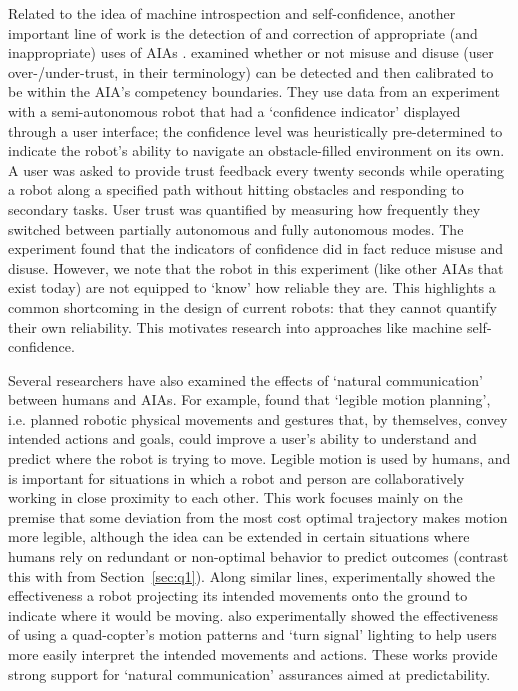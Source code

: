 Related to the idea of machine introspection and self-confidence, another important line of work is the detection of and correction of appropriate (and inappropriate) uses of AIAs \cite{Muir1994-ow,Kaniarasu2013-ho}. 
\citet{Kaniarasu2013-ho} examined whether or not misuse and disuse (user over-/under-trust, in their terminology) can be detected and then calibrated to be within the AIA's competency boundaries. 
They use data from an experiment with a semi-autonomous robot that had a `confidence indicator' displayed through a user interface; the confidence level was heuristically pre-determined to indicate the robot's ability to navigate an obstacle-filled environment on its own. 
A user was asked to provide trust feedback every twenty seconds while operating a robot along a specified path without hitting obstacles and responding to secondary tasks. 
User trust was quantified by measuring how frequently they switched between partially autonomous and fully autonomous modes. The experiment found that the indicators of confidence did in fact reduce misuse and disuse. 
However, we note that the robot in this experiment (like other AIAs that exist today) are not equipped to `know' how reliable they are. This highlights a common shortcoming in the design of current robots: that they cannot quantify their own reliability. This motivates research into approaches like machine self-confidence. 

Several researchers have also examined the effects of `natural communication' between humans and AIAs. %
For example, \citet{Dragan2013-wd} found that `legible motion planning', i.e. planned robotic physical movements and gestures that, by themselves, convey intended actions and goals, could improve a user's ability to understand and predict where the robot is trying to move. 
Legible motion is used by humans, and is important for situations in which a robot and person are collaboratively working in close proximity to each other. %
This work focuses mainly on the premise that some deviation from the most cost optimal trajectory makes motion more legible, although the idea can be extended in certain situations where humans rely on redundant or non-optimal behavior to predict outcomes (contrast this with \citet{Wu2016-ei} from Section~\ref{sec:q1}). 
Along similar lines, \citet{Chadalavada2015-wx} experimentally showed the effectiveness a robot projecting its intended movements onto the ground to indicate where it would be moving.  %
\citet{Szafir2014-ok,Szafir2015-iy} also experimentally showed the effectiveness of using a quad-copter's motion patterns and `turn signal' lighting to help users more easily interpret the intended movements and actions. 
These works provide strong support for `natural communication' assurances aimed at predictability. 


